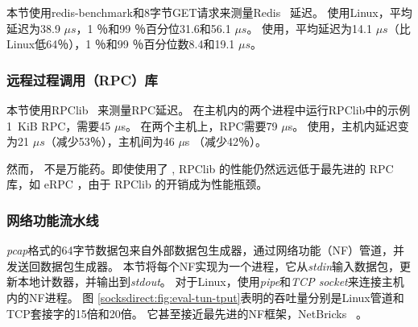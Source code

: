 本节使用redis-benchmark和8字节GET请求来测量Redis~ \cite {redis}延迟。
使用Linux，平均延迟为38.9 $ \mu s $，1 ％和99 ％百分位31.6和56.1 $ \mu s $。
使用\sys {}，平均延迟为14.1 $ \mu s $（比Linux低64％），1 ％和99 ％百分位数8.4和19.1 $ \mu s$。







\subsubsection{远程过程调用（RPC）库}

本节使用RPClib~ \cite {rpclib}来测量RPC延迟。
在主机内的两个进程中运行RPClib中的示例1~KiB RPC，需要45 $ \mu $s。 在两个主机上，RPC需要79 $ \mu$s。
使用\sys {}，主机内延迟变为21 $ \mu s $（减少53％），主机间为46 $ \mu$s （减少42％）。

然而，\sys{} 不是万能药。即使使用了 \libipc{}, RPClib 的性能仍然远远低于最先进的 RPC 库，如 eRPC \cite{kalia2018datacenter}，由于 RPClib 的开销成为性能瓶颈。

\subsubsection{网络功能流水线}

\emph {pcap}格式的64字节数据包来自外部数据包生成器，通过网络功能（NF）管道，并发送回数据包生成器。
本节将每个NF实现为一个进程，它从\emph {stdin}输入数据包，更新本地计数器，并输出到\emph {stdout}。
对于Linux，使用\emph {pipe}和\emph {TCP socket}来连接主机内的NF进程。
图 \ref {socksdirect:fig:eval-tun-tput}表明\sys {}的吞吐量分别是Linux管道和TCP套接字的15倍和20倍。
它甚至接近最先进的NF框架，NetBricks~ \cite {panda2016netbricks}。


